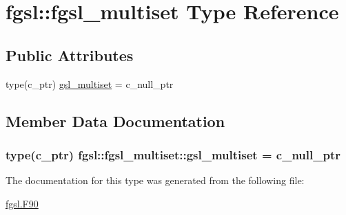 \hypertarget{structfgsl_1_1fgsl__multiset}{\section{fgsl\-:\-:fgsl\-\_\-multiset Type Reference}
\label{structfgsl_1_1fgsl__multiset}
}
\subsection*{Public Attributes}
\begin{DoxyCompactItemize}
\item 
type(c\-\_\-ptr) \hyperlink{structfgsl_1_1fgsl__multiset_a765558536dedfa6bd75d2d571a879185}{gsl\-\_\-multiset} = c\-\_\-null\-\_\-ptr
\end{DoxyCompactItemize}


\subsection{Member Data Documentation}
\hypertarget{structfgsl_1_1fgsl__multiset_a765558536dedfa6bd75d2d571a879185}{
\subsubsection[{gsl\-\_\-multiset}]{\setlength{\rightskip}{0pt plus 5cm}type(c\-\_\-ptr) fgsl\-::fgsl\-\_\-multiset\-::gsl\-\_\-multiset = c\-\_\-null\-\_\-ptr}}\label{structfgsl_1_1fgsl__multiset_a765558536dedfa6bd75d2d571a879185}


The documentation for this type was generated from the following file\-:\begin{DoxyCompactItemize}
\item 
\hyperlink{fgsl_8F90}{fgsl.\-F90}\end{DoxyCompactItemize}
